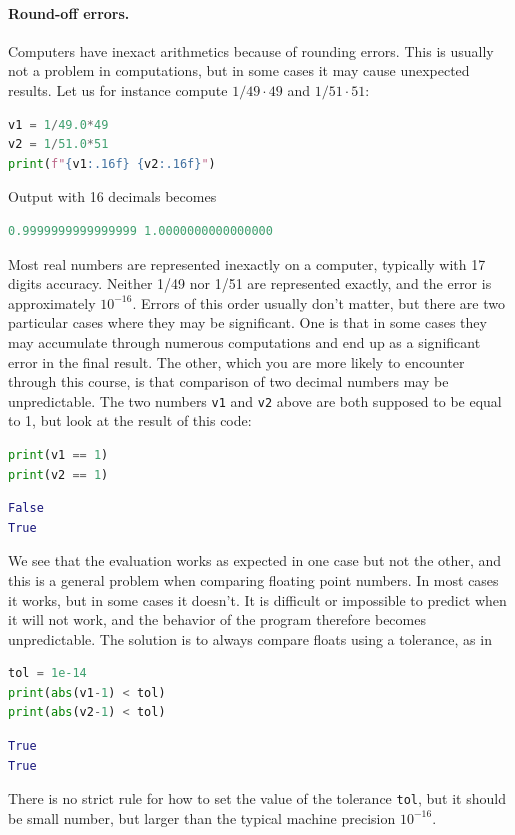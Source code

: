 \documentclass[graybox,envcountchap,sectrefs,final]{svmonodo}
\begin{document}
\paragraph{Round-off errors.}
Computers have inexact arithmetics because of rounding errors. This is usually not a problem in computations, but in some cases it
may cause unexpected results. Let us for instance compute $1/49\cdot 49$ and $1/51\cdot 51$:
\begin{lstlisting}[language=Python,style=blue1]
v1 = 1/49.0*49
v2 = 1/51.0*51
print(f"{v1:.16f} {v2:.16f}")
\end{lstlisting}
Output with 16 decimals becomes
\begin{lstlisting}[language=Python,style=gray]
 0.9999999999999999 1.0000000000000000
\end{lstlisting}
Most real numbers are represented inexactly on a computer, typically with 17 digits accuracy.
Neither 1/49 nor 1/51 are represented exactly, and the error is approximately $10^{-16}$. Errors of this order usually don't
matter, but there are two particular cases where they may be significant. One is that in some cases they may accumulate
through numerous computations and end up as a significant error in the final result. The other, which you are more likely to
encounter through this course, is that comparison of two decimal numbers may be unpredictable. The two numbers
\texttt{v1} and \texttt{v2} above are both supposed to be equal to 1, but look at the result of this code:
\begin{lstlisting}[language=Python,style=blue1]
print(v1 == 1)
print(v2 == 1)
\end{lstlisting}
\begin{lstlisting}[language=Python,style=gray]
False
True
\end{lstlisting}
We see that the evaluation works as expected in one case but not the other, and this is a general problem when comparing floating
point numbers. In most cases it works, but in some cases it doesn't. It is difficult or impossible to predict when it will not
work, and the behavior of the program therefore becomes unpredictable. The solution is to always compare floats using a tolerance,
as in
\begin{lstlisting}[language=Python,style=blue1]
tol = 1e-14
print(abs(v1-1) < tol)
print(abs(v2-1) < tol)
\end{lstlisting}
\begin{lstlisting}[language=Python,style=gray]
True
True
\end{lstlisting}
There is no strict rule for how to set the value of the tolerance \texttt{tol}, but it should be small number, but larger than the
typical machine precision $10^{-16}$.
\end{document}
